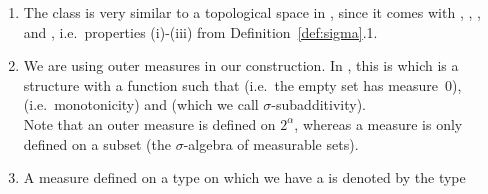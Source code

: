 \documentclass[lean]{DraftAFM}
\begin{document}
\begin{remark}
  \begin{enumerate}
  \item \sloppy The class  is very similar
    to a topological space in , since it comes with
    ,
    ,
    , and ,
    i.e.\ properties (i)-(iii) from Definition~\ref{def:sigma}.1.
  \item We are using outer measures in our construction. In
    , this is  which is a structure with a function
     such that  (i.e.\ the empty set has measure~$0$),
    (i.e.\ monotonicity) and  (which we call
    $\sigma$-subadditivity). \\ Note that an outer measure is defined
    on $2^\alpha$, whereas a measure is only defined on a subset (the
    $\sigma$-algebra of measurable sets).
  \item A measure defined on a type  on which we have a  is denoted by the type 
  \end{enumerate}
\end{remark}

\noindent
\end{document}
